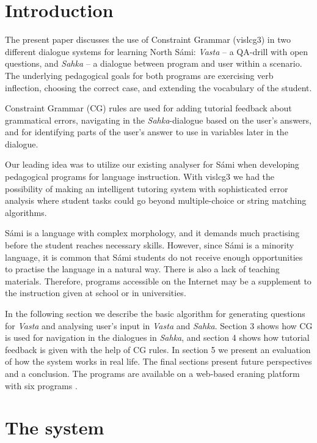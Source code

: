 \documentclass[11pt]{article}
\begin{document}
\section{Introduction} 

The present paper discusses the use of Constraint Grammar (vislcg3) in two different dialogue systems for learning North Sámi: \textit{Vasta} -- a QA-drill with open questions, and \textit{Sahka} -- a  dialogue between program and user within a scenario. The underlying pedagogical goals for both programs are exercising verb inflection, choosing the correct case, and extending the vocabulary of the student. 

Constraint Grammar (CG) rules are used for adding tutorial feedback about grammatical errors, navigating in the \textit{Sahka}-dialogue based on the user's answers, and for identifying parts of the user's answer to use in variables later in the dialogue. 

Our leading idea was to utilize our existing analyser for Sámi when developing pedagogical programs for language instruction. With vislcg3 we had the possibility of making an intelligent tutoring system with sophisticated error analysis where student tasks could go beyond multiple-choice or string matching algorithms. 

Sámi is a language with complex morphology, and it demands much practising before the student reaches necessary skills. However, since Sámi is a minority language, it is common that Sámi students do not receive enough opportunities to practise the language in a natural way. There is also a lack of teaching materials. Therefore, programs accessible on the Internet may be a supplement to the instruction given at school or in universities.

In the following section we describe the basic algorithm for generating questions for \textit{Vasta} and analysing user's input in \textit{Vasta} and \textit{Sahka}. Section 3 shows how CG is used for navigation in the dialogues in \textit{Sahka}, and section 4 shows how tutorial feedback is given with the help of CG rules. In section 5 we present an evaluation of how the system works in real life. The final sections present future perspectives and a conclusion. The programs are available on a web-based eraning platform with six programs \cite{Antonsen:09}.

\section{The system}
\end{document}
